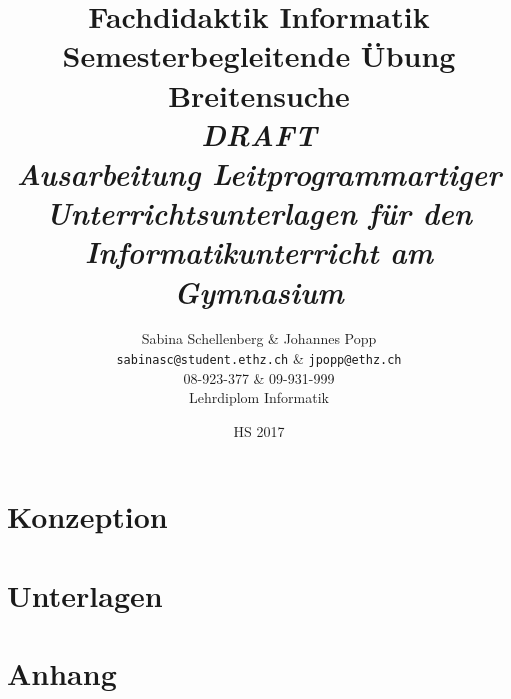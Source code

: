 \documentclass[12pt,a4paper,titlepage]{report}
\theoremstyle{definition}
\begin{document}
\makeatletter\renewcommand{\ALG@name}{Algorithmus}

\title{
\textbf{Fachdidaktik Informatik} \\ 
\vspace{0cm} 
\Large Semesterbegleitende Übung  \\ 
\vspace{4cm} 
\huge \textbf{Breitensuche} \\ 
\huge{\emph{DRAFT}} \\
\vspace{1cm} 
\large \emph{Ausarbeitung Leitprogrammartiger Unterrichtsunterlagen für den Informatikunterricht am Gymnasium} 
\vspace{4cm}
}

\author{Sabina Schellenberg \& Johannes Popp \\ \texttt{sabinasc@student.ethz.ch} \& \texttt{jpopp@ethz.ch} \\ 08-923-377 \& 09-931-999 \\ Lehrdiplom Informatik}
\date{HS 2017}
\maketitle
\tableofcontents
\setcounter{page}{2}


\chapter{Konzeption}






\chapter{Unterlagen}










%
%
%
%
%
%
%
%
%
%
%
%
%
%




%



\chapter{Anhang}

%


%
\end{document}
